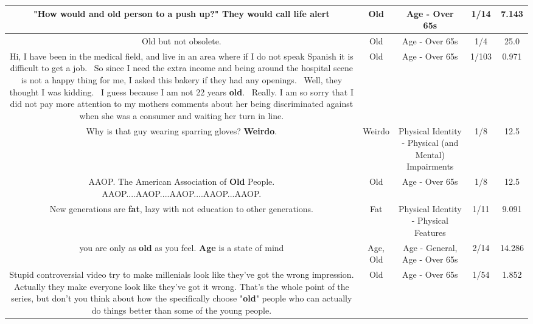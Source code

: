 \documentclass[11pt]{article}
\newlength\mylength
\begin{document}
\begin{center}
\begin{longtable}{|C{.65\mylength}|C{.30\mylength}|C{.12\mylength}|C{.12\mylength}|C{.12\mylength}|}
  \small "How would and \textbf{old} person to a push up?" They would call life alert\normalsize   & Old & Age - Over 65s & 1/14 & 7.143 \\  \hline
  \small Old but not obsolete.\normalsize   & Old & Age - Over 65s & 1/4 & 25.0 \\  \hline
  \small Hi, I have been in the medical field, and live in an area where if I do not speak Spanish it is difficult to get a job.  So since I need the extra income and being around the hospital scene is not a happy thing for me, I asked this bakery if they had any openings.  Well, they thought I was kidding.  I guess because I am not 22 years \textbf{old}.  Really. I am so sorry that I did not pay more attention to my mothers comments about her being discriminated against when she was a consumer and waiting her turn in line.\normalsize   & Old & Age - Over 65s & 1/103 & 0.971 \\  \hline
  \small Why is that guy wearing sparring gloves? \textbf{Weirdo}.\normalsize   & Weirdo & Physical Identity - Physical (and Mental) Impairments & 1/8 & 12.5 \\  \hline
  \small AAOP. The American Association of \textbf{Old} People. AAOP....AAOP....AAOP....AAOP...AAOP.\normalsize   & Old & Age - Over 65s & 1/8 & 12.5 \\  \hline
  \small New generations are \textbf{fat}, lazy with not education to other generations.\normalsize   & Fat & Physical Identity - Physical Features & 1/11 & 9.091 \\  \hline
  \small you are only as \textbf{old} as you feel. \textbf{Age} is a state of mind\normalsize   & Age, Old & Age - General, Age - Over 65s & 2/14 & 14.286 \\  \hline
  \small Stupid controversial video try to make millenials look like they've got the wrong impression. Actually they make everyone look like they've got it wrong. That's the whole point of the series, but don't you think about how the specifically choose "\textbf{old}" people who can actually do things better than some of the young people.\normalsize   & Old & Age - Over 65s & 1/54 & 1.852 \\  \hline

\end{longtable}
\end{center}
\end{document}
